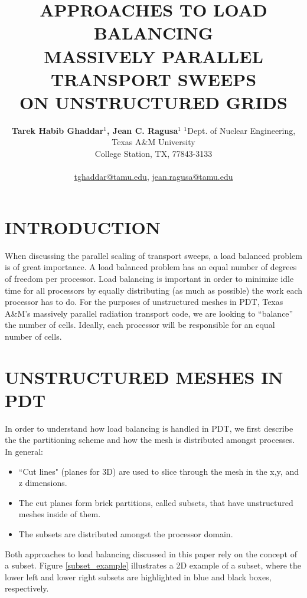 \documentclass[letterpaper]{mandc2019}
\title{APPROACHES TO LOAD BALANCING \\
MASSIVELY PARALLEL TRANSPORT SWEEPS \\
 ON UNSTRUCTURED GRIDS}
\author{%
  \textbf{Tarek Habib Ghaddar$^1$, Jean C. Ragusa$^1$}%
  $^1$Dept. of Nuclear Engineering, Texas  A\&M University \\
  College Station, TX, 77843-3133 \\ 
\\
  \url{tghaddar@tamu.edu}, \url{jean.ragusa@tamu.edu}
}
\begin{document}
\maketitle
\justify 

\section{INTRODUCTION} 
When discussing the parallel scaling of transport sweeps, a load balanced problem is of great importance. A load balanced problem has an equal number of degrees of freedom per processor. Load balancing is important in order to minimize idle time for all processors by equally distributing (as much as possible) the work each processor has to do.  For the purposes of unstructured meshes in PDT, Texas A\&M's massively parallel radiation transport code, we are looking to ``balance'' the number of cells. Ideally, each processor will be responsible for an equal number of cells. 

\section{UNSTRUCTURED MESHES IN PDT} 
\label{sec:first}

In order to understand how load balancing is handled in PDT, we first describe the the partitioning scheme and how the mesh is distributed amongst processes.  In general:
\vspace{-1cm}
\begin{itemize}\itemsep 1pt \parskip 0pt \parsep 0pt
\item ``Cut lines" (planes for 3D) are used to slice through the mesh in the x,y, and z dimensions.
\item The cut planes form brick partitions, called subsets, that have unstructured meshes inside of them. 
\item The subsets are distributed amongst the processor domain.
\end{itemize}
\vspace{-1cm}

Both approaches to load balancing discussed in this paper rely on the concept of a subset. Figure \ref{subset_example} illustrates a 2D example of a subset, where the lower left and lower right subsets are highlighted in blue and black boxes, respectively. 
\end{document}
